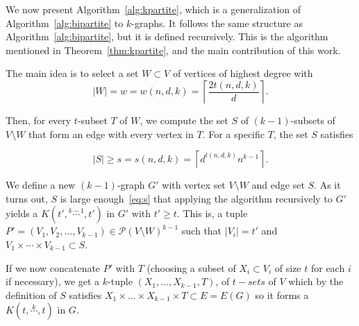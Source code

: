 We now present Algorithm~\ref{alg:kpartite}, which is
a generalization of Algorithm~\ref{alg:bipartite} to $k$-graphs.
It follows the same structure as Algorithm~\ref{alg:bipartite},
but it is defined recursively.
This is the algorithm mentioned in Theorem~\ref{thm:kpartite},
and the main contribution of this work.

The main idea is to select a set $W \subset V$ of vertices of highest degree with
\begin{equation}
    \label{eq:w}
    |W| = w = w(n, d, k) = \left\lceil \frac{2t(n, d, k)}{d} \right\rceil.
\end{equation}

Then, for every $t$-subset $T$ of $W$, we compute the set $S$ of $(k-1)$-subsets of $V \setminus W$
that form an edge with every vertex in $T$.
For a specific $T$, the set $S$ satisfies

\begin{equation}
    \label{eq:s}
    |S| \geq s = s(n, d, k) = \left\lceil d^{t(n, d, k)} n^{k-1} \right\rceil.
\end{equation}

We define a new $(k-1)$-graph $G'$ with vertex set $V \setminus W$ and edge set $S$.
As it turns out, $S$ is large enough~\eqref{eq:s}
that applying the algorithm recursively to $G'$
yields a $K(t', \overset{k-1}{\cdots}, t')$ in $G'$ with $t' \geq t$.
This is, a tuple
$P' = (V_1, V_2, \ldots, V_{k-1}) \in \mathcal{P}(V \setminus W)^{k-1}$ such that $|V_i| = t'$ and
$V_1 \times \cdots \times V_{k-1}\subset S$.

If we now concatenate $P'$ with $T$ (choosing a subset of $X_i \subset V_i$ of size $t$ for each $i$ if necessary), we get
a $k$-tuple $(X_1, \ldots, X_{k-1}, T)$, of $t-sets$ of $V$ %
which by the definition of $S$ satisfies
$X_1 \times \dots \times X_{k-1} \times T \subset E = E(G)$
so it forms a $K(t, \overset{k}{\cdots}, t)$ in $G$.

